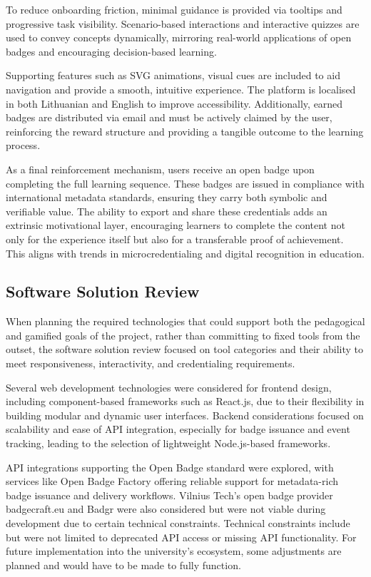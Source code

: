 To reduce onboarding friction, minimal guidance is provided via tooltips and progressive task visibility. 
Scenario-based interactions and interactive quizzes are used to convey concepts dynamically, mirroring real-world applications of open badges and encouraging decision-based learning. 

Supporting features such as SVG animations, visual cues are included to aid navigation and provide a smooth, intuitive experience. 
The platform is localised in both Lithuanian and English to improve accessibility. 
Additionally, earned badges are distributed via email and must be actively claimed by the user, reinforcing the reward structure and providing a tangible outcome to the learning process.

As a final reinforcement mechanism, users receive an open badge upon completing the full learning sequence. 
These badges are issued in compliance with international metadata standards, ensuring they carry both symbolic and verifiable value. 
The ability to export and share these credentials adds an extrinsic motivational layer, encouraging learners to complete the content not only for the experience itself but also for a transferable proof of achievement. 
This aligns with trends in microcredentialing and digital recognition in education.

\subsection{Software Solution Review}

When planning the required technologies that could support both the pedagogical and gamified goals of the project, rather than committing to fixed tools from the outset, the software solution review focused on tool categories and their ability to meet responsiveness, interactivity, and credentialing requirements.

Several web development technologies were considered for frontend design, including component-based frameworks such as React.js, due to their flexibility in building modular and dynamic user interfaces. 
Backend considerations focused on scalability and ease of API integration, especially for badge issuance and event tracking, leading to the selection of lightweight Node.js-based frameworks.

API integrations supporting the Open Badge standard were explored, with services like Open Badge Factory offering reliable support for metadata-rich badge issuance and delivery workflows.
Vilnius Tech's open badge provider badgecraft.eu and Badgr were also considered but were not viable during development due to certain technical constraints. 
Technical constraints include but were not limited to deprecated API access or missing API functionality.
For future implementation into the university's ecosystem, some adjustments are planned and would have to be made to fully function.

